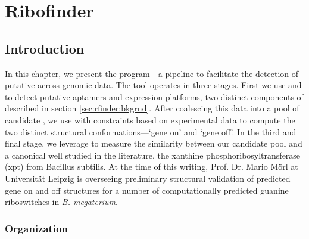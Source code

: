 
\newcommand{\fnaRetrievalTime}{\formatdate{25}{11}{2014} at \formattime{9}{14}{0}}
\newcommand{\tree}{{\mathcal T}\xspace}
\newcommand{\treeFor}[1]{\ensuremath{{\mathcal T}_{\text #1}}}
\newcommand{\textdown}[2]{\ensuremath{{\text{#1}}_{\text{#2}}}}
\newcommand{\treePos}[2]{\textdown{\ms{#1}}{#2}}
\newcommand{\treeIdx}[3]{\treePos{#1}{#2}\ensuremath{(#3)}}

\newcommand{\strConst}[1]{\ensuremath{{\mathcal C}_{\text{#1}}}\xspace}
\newcommand{\strOff}{\ensuremath{{\mathcal S}_{\text{off}}}\xspace}
\newcommand{\strOn}{\ensuremath{{\mathcal S}_{\text{on}}}\xspace}

\newcommand{\rshapes}{\ms{RNAshapes}}

\chapter{Ribofinder}
\label{ch:rfinder}


\section{Introduction}
\label{sec:rfinder:intro}

In this chapter, we present the \rfinder program---a pipeline to facilitate the
detection of putative \grbs across genomic data. The \rfinder
tool operates in three stages. First we use \infernal and \tthp to detect
putative aptamers and expression platforms, two distinct components of
\rbs described in section \ref{sec:rfinder:bkgrnd}. After coalescing
this data into a pool of candidate \rbs, we use \rfold with constraints
based on experimental data to compute the two distinct structural
conformations---`gene on' and `gene off'. In the third and final stage, we
leverage \foldalign to measure the similarity between our candidate pool and a
canonical \grb well studied in the literature, the
xanthine phosphoribosyltransferase (xpt) \grb from Bacillus subtilis. At the time
of this writing, Prof. Dr. Mario
M\"orl at Universit\"at Leipzig is overseeing preliminary structural
validation of predicted gene on and off structures for a number of
computationally predicted guanine riboswitches in {\em B. megaterium}.

\subsection{Organization}
\label{subsec:rfinder:org}

